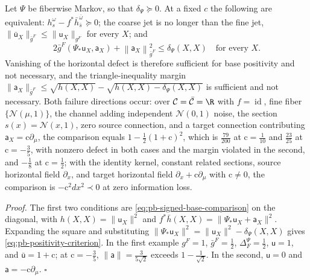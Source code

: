 Let \(\Psi\) be fiberwise Markov, so that \(\delta_\Psi\succeq0\). At a fixed \(c\) the following are
equivalent: \(h_s^\omega-f^*\bar h_{\bar s}^{\bar\omega}\succeq0\); the coarse jet is no longer than the
fine jet, \(\lVert\bar{\mathsf u}_X\rVert_{\bar g^F}\leq\lVert\mathsf u_X\rVert_{g^F}\) for every
\(X\); and
\begin{equation}
2\bar g^F\left(\Psi_*\mathsf u_X,\mathsf a_X\right)
+\left\lVert\mathsf a_X\right\rVert^2_{\bar g^F}
\leq\delta_\Psi(X,X)
\quad\text{for every }X.
\label{eq:pb-positivity-criterion}
\end{equation}
Vanishing of the horizontal defect is therefore sufficient for base positivity and not necessary, and
the triangle-inequality margin
\(\lVert\mathsf a_X\rVert_{\bar g^F}\leq\sqrt{h(X,X)}-\sqrt{h(X,X)-\delta_\Psi(X,X)}\) is sufficient
and not necessary. Both failure directions occur: over \(\mathcal C=\bar{\mathcal C}=\R\) with
\(f=\operatorname{id}\), fine fiber \(\{\mathcal N(\mu,1)\}\), the channel adding independent
\(\mathcal N(0,1)\) noise, the section \(s(x)=\mathcal N(x,1)\), zero source connection, and a target
connection contributing \(\mathsf a_X=\mathrm c\partial_\mu\), the comparison equals
\(1-\tfrac12(1+\mathrm c)^2\), which is \(\tfrac{79}{200}\) at \(\mathrm c=\tfrac1{10}\) and
\(\tfrac{23}{25}\) at \(\mathrm c=-\tfrac35\), with nonzero defect in both cases and the margin violated
in the second, and \(-\tfrac18\) at \(\mathrm c=\tfrac12\); with the identity kernel, constant related
sections, source horizontal field \(\partial_x\), and target horizontal field
\(\partial_x+\mathrm c\partial_\mu\) with \(\mathrm c\ne0\), the comparison is
\(-\mathrm c^2dx^2\prec0\) at zero information loss. 

\noindent\emph{Proof.}
The first two conditions are \eqref{eq:pb-signed-base-comparison} on the diagonal, with
\(h(X,X)=\lVert\mathsf u_X\rVert^2\) and \(f^*\bar h(X,X)=\lVert\Psi_*\mathsf u_X+\mathsf a_X\rVert^2\).
Expanding the square and substituting
\(\lVert\Psi_*\mathsf u_X\rVert^2=\lVert\mathsf u_X\rVert^2-\delta_\Psi(X,X)\) gives
\eqref{eq:pb-positivity-criterion}. In the first example \(g^F=1\), \(\bar g^F=\tfrac12\),
\(\Delta_F^\Psi=\tfrac12\), \(\mathsf u=1\), and \(\bar{\mathsf u}=1+\mathrm c\); at
\(\mathrm c=-\tfrac35\), \(\lVert\mathsf a\rVert=\tfrac{3}{5\sqrt2}\) exceeds \(1-\tfrac1{\sqrt2}\).
In the second, \(\mathsf u=0\) and \(\mathsf a=-\mathrm c\partial_\mu\). \hfill$\square$

